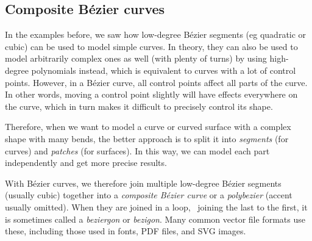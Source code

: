 \subsection{Composite B\'ezier curves}

In the examples before, we saw how low-degree B\'ezier segments (eg quadratic or cubic) can be used to model simple curves.
In theory, they can also be used to model arbitrarily complex ones as well (with plenty of turns) by using high-degree polynomials instead, which is equivalent to curves with a lot of control points.
However, in a B\'ezier curve, all control points affect all parts of the curve.
In other words, moving a control point slightly will have effects everywhere on the curve, which in turn makes it difficult to precisely control its shape.


Therefore, when we want to model a curve or curved surface with a complex shape with many bends, the better approach is to split it into \emph{segments} (for curves) and \emph{patches} (for surfaces).
In this way, we can model each part independently and get more precise results.

With B\'ezier curves, we therefore join multiple low-degree B\'ezier segments (usually cubic) together into a \emph{composite B\'ezier curve} or a \emph{polybezier} (accent usually omitted).
When they are joined in a loop, \ie\ joining the last to the first, it is sometimes called a \emph{beziergon} or \emph{bezigon}.
Many common vector file formats use these, including those used in fonts, PDF files, and SVG images.

